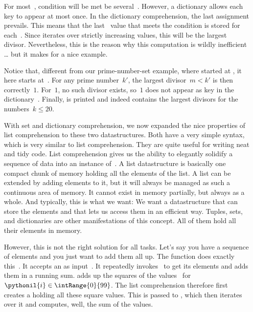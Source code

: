 For most~, condition will be met be several~.
However, a dictionary allows each key to appear at most once.
In the dictionary comprehension, the last assignment prevails.
This means that the last~ value that meets the condition is stored for each~.
Since  iterates over strictly increasing values, this will be the largest divisor.
Nevertheless, this is the reason why this computation is wildly inefficient {\dots} but it makes for a nice example.

Notice that, different from our prime-number-set example, where  started at , it here  starts at~.
For any prime number~$k'$, the largest divisor~$m<k'$ is then correctly~$1$.
For~$1$, no such divisor exists, so~$1$ does not appear as key in the dictionary~.
Finally,  is printed and indeed contains the largest divisors for the numbers~$k\leq20$.

With set and dictionary comprehension, we now expanded the nice properties of list comprehension to these two datastructures.
Both have a very simple syntax, which is very similar to list comprehension.
They are quite useful for writing neat and tidy code.%
\FloatBarrier%
\endhsection%
%
%
\label{sec:generatorExpressions}%
%
List comprehension gives us the ability to elegantly solidify a sequence of data into an instance of~.
A list datastructure is basically one compact chunk of memory holding all the elements of the list.
A list can be extended by adding elements to it, but it will always be managed as such a continuous area of memory.
It cannot exist in memory partially, but always as a whole.
And typically, this is what we want:
We want a datastructure that can store the elements and that lets us access them in an efficient way.
Tuples, sets, and dictionaries are other manifestations of this concept.
All of them hold all their elements in memory.

However, this is not the right solution for all tasks.
Let's say you have a sequence of elements and you just want to add them all up.
The  function does exactly this~\cite{PSF:P3D:TPSL:BIF}.
It accepts an  as input~\cite{PSF:P3D:TPSL:BIF}.
It repeatedly invokes~ to get its elements and adds them in a running sum.
 adds up the squares of the values~ for~$\pythonil{i}\in\intRange{0}{99}$.
The list comprehension therefore first creates a  holding all these square values.
This  is passed to , which then iterates over it and computes, well, the sum of the values.

